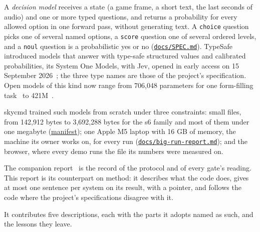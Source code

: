 \documentclass[10pt]{article}
\begin{document}
A \emph{decision model} receives a state (a game frame, a short text, the last seconds of audio) and one or more typed questions, and returns a probability for every allowed option in one forward pass, without generating text. A \texttt{choice} question picks one of several named options, a \texttt{score} question one of several ordered levels, and a \texttt{noul} question is a probabilistic yes or no (\href{https://github.com/maxgfr/skycmd/blob/main/docs/SPEC.md}{\texttt{docs/\allowbreak{}SPEC.md}}). TypeSafe introduced models that answer with type-safe structured values and calibrated probabilities, its System One Models, with Jev, opened in early access on 15 September 2026~\cite{jev}; the three type names are those of the project's specification. Open models of this kind now range from 706,048 parameters for one form-filling task~\cite{cua} to 421M~\cite{laya}.

skycmd trained such models from scratch under three constraints: small files, from 142,912 bytes to 3,692,288 bytes for the s6 family and most of them under one megabyte (\href{https://maxgfr.github.io/skycmd/models/manifest.json}{manifest}); one Apple M5 laptop with 16 GB of memory, the machine its owner works on, for every run (\href{https://github.com/maxgfr/skycmd/blob/main/docs/big-run-report.md}{\texttt{docs/\allowbreak{}big-run-report.md}}); and the browser, where every demo runs the file its numbers were measured on.

The companion report~\cite{golfier2026skycmd} is the record of the protocol and of every gate's reading. This report is its counterpart on method: it describes what the code does, gives at most one sentence per system on its result, with a pointer, and follows the code where the project's specifications disagree with it.

It contributes five descriptions, each with the parts it adopts named as such, and the lessons they leave.
\end{document}
